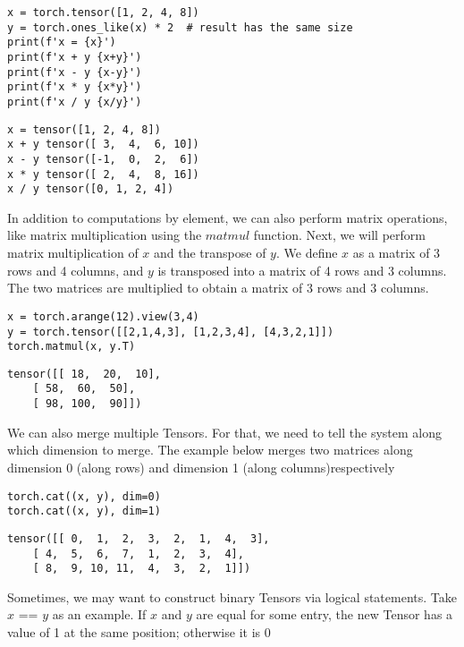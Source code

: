 \documentclass[]{article}
\begin{document}
\begin{verbatim}
x = torch.tensor([1, 2, 4, 8])
y = torch.ones_like(x) * 2	# result has the same size
print(f'x = {x}')
print(f'x + y {x+y}')
print(f'x - y {x-y}')
print(f'x * y {x*y}')
print(f'x / y {x/y}')
\end{verbatim}

\begin{verbatim}
x = tensor([1, 2, 4, 8])
x + y tensor([ 3,  4,  6, 10])
x - y tensor([-1,  0,  2,  6])
x * y tensor([ 2,  4,  8, 16])
x / y tensor([0, 1, 2, 4])
\end{verbatim}

In addition to computations by element, we can also perform matrix operations, like matrix multiplication using the $ matmul $ function. Next, we will perform matrix multiplication of $ x $ and the transpose of $ y $. We define $ x $ as a matrix of 3 rows and 4 columns, and $ y $ is transposed into a matrix of 4 rows and 3 columns. The two matrices are multiplied to obtain a matrix of 3 rows and 3 columns.

\begin{verbatim}
x = torch.arange(12).view(3,4)
y = torch.tensor([[2,1,4,3], [1,2,3,4], [4,3,2,1]])
torch.matmul(x, y.T) 
\end{verbatim}

\begin{verbatim}
tensor([[ 18,  20,  10],
	[ 58,  60,  50],
	[ 98, 100,  90]])
\end{verbatim}

We can also merge multiple Tensors. For that, we need to tell the system along which dimension to merge. The example below merges two matrices along dimension 0 (along rows) and dimension 1 (along columns)respectively

\begin{verbatim}
torch.cat((x, y), dim=0)
torch.cat((x, y), dim=1)
\end{verbatim}

\begin{verbatim}
tensor([[ 0,  1,  2,  3,  2,  1,  4,  3],
	[ 4,  5,  6,  7,  1,  2,  3,  4],
	[ 8,  9, 10, 11,  4,  3,  2,  1]])
\end{verbatim}

Sometimes, we may want to construct binary Tensors via logical statements. Take $ x $ == $ y $ as an example. If $ x $ and $ y $ are equal for some entry, the new Tensor has a value of 1 at the same position; otherwise it is 0
\end{document}
